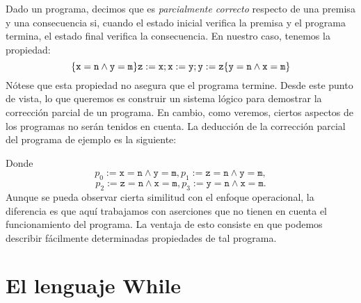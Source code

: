 Dado un programa, decimos que es \textit{parcialmente correcto} respecto de una premisa y una consecuencia si, cuando el estado inicial verifica la premisa y el programa termina, el estado final verifica la consecuencia. En nuestro caso, tenemos la propiedad:
$$\{\nx = \texttt{n}\land \ny = \texttt{m}\}\nz:= \nx; \nx := \ny; \ny := \nz\{\ny = \texttt{n}\land \nx = \texttt{m}\}$$
Nótese que esta propiedad no asegura que el programa termine. Desde este punto de vista, lo que queremos es construir un sistema lógico para demostrar la corrección parcial de un programa. En cambio, como veremos, ciertos aspectos de los programas no serán tenidos en cuenta.
La deducción de la corrección parcial del programa de ejemplo es la siguiente:
\begin{prooftree}
\end{prooftree}
Donde
$$p_0 := \texttt{x}=\texttt{n}\land\texttt{y}=\texttt{m}, p_1 := \texttt{z}=\texttt{n}\land\texttt{y}=\texttt{m},$$
$$p_2 := \texttt{z}=\texttt{n}\land\texttt{x}=\texttt{m}, p_3 := \texttt{y}=\texttt{n}\land\texttt{x}=\texttt{m}.$$
Aunque se pueda observar cierta similitud con el enfoque operacional, la diferencia es que aquí trabajamos con aserciones que no tienen en cuenta el funcionamiento del programa. La ventaja de esto consiste en que podemos describir fácilmente determinadas propiedades de tal programa.


\section{El lenguaje While}

